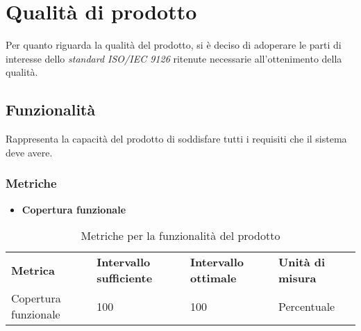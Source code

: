 \section{Qualità di prodotto}
Per quanto riguarda la qualità del prodotto, si è deciso di adoperare le parti di interesse dello \textit{standard ISO/IEC 9126\glos} ritenute necessarie all'ottenimento della qualità.
\subsection{Funzionalità}
Rappresenta la capacità del prodotto di soddisfare tutti i requisiti che il sistema deve avere.
\subsubsection{Metriche}
\begin{itemize}
	\item \textbf{Copertura funzionale}
\end{itemize}

\renewcommand{\arraystretch}{2.2}
\begin{longtable}{|C{4.5cm}|C{2.25cm}|C{2.25cm}|C{3cm}|}

	\caption{Metriche per la funzionalità del prodotto}\\
	\hline

	\textbf{Metrica} & \textbf{Intervallo sufficiente}  & \textbf{Intervallo ottimale} & \textbf{Unità di misura}
	\tabularnewline
	\endfirsthead

	Copertura funzionale &  100 & 100 & Percentuale \\

\end{longtable}

